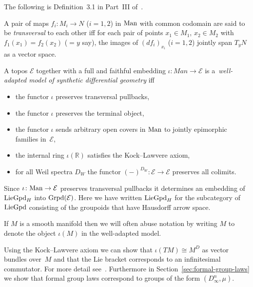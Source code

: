 \documentclass[pdftex]{sigma}
\numberwithin{equation}{section}
\begin{document}
The following is Def\/inition~3.1 in Part~III of~\cite{MR2244115}.

\begin{Definition}A pair of maps $f_i\colon M_i \rightarrow N$ ($i=1,2$) in ${\rm Man}$ with common codomain are said to be \emph{transversal} to each other if\/f for each pair of points $x_1\in M_1$, $x_2\in M_2$ with $f_1(x_1)=f_2(x_2)$ ($=y$ say), the images of $(df_i)_{x_i}$ ($i=1,2$) jointly span $T_y N$ as a vector space.
\end{Definition}

\begin{Definition}A topos $\mathcal{E}$ together with a full and faithful embedding $\iota\colon Man\rightarrow \mathcal{E}$ is a~\emph{well-adapted model of synthetic differential geometry} if\/f
\begin{itemize}\itemsep=0pt
\item the functor $\iota$ preserves transversal pullbacks,
\item the functor $\iota$ preserves the terminal object,
\item the functor $\iota$ sends arbitrary open covers in ${\rm Man}$ to jointly epimorphic families in~$\mathcal{E}$,
\item the internal ring $\iota(\mathbb{R})$ satisf\/ies the Kock--Lawvere axiom,
\item for all Weil spectra $D_W$ the functor $(-)^{D_W}\colon \mathcal{E}\rightarrow \mathcal{E}$ preserves all colimits.
\end{itemize}
\end{Definition}

\begin{Remark}Since $\iota\colon {\rm Man} \rightarrow \mathcal{E}$ preserves transversal pullbacks it determines an embedding of ${\rm LieGpd}_H$ into ${\rm Grpd}(\mathcal{E})$. Here we have written ${\rm LieGpd}_H$ for the subcategory of ${\rm LieGpd}$ consisting of the groupoids that have Hausdorf\/f arrow space.
\end{Remark}

\begin{Remark}If $M$ is a smooth manifold then we will often abuse notation by writing $M$ to denote the object $\iota(M)$ in the well-adapted model.
\end{Remark}

Using the Kock--Lawvere axiom we can show that $\iota(TM)\cong M^D$ as vector bundles over~$M$ and that the Lie bracket corresponds to an inf\/initesimal commutator. For more detail see~\cite{MR2244115}. Further\-more in Section~\ref{sec:formal-group-laws} we show that formal group laws correspond to groups of the form $(D_{\infty}^n,\mu)$.
\end{document}
